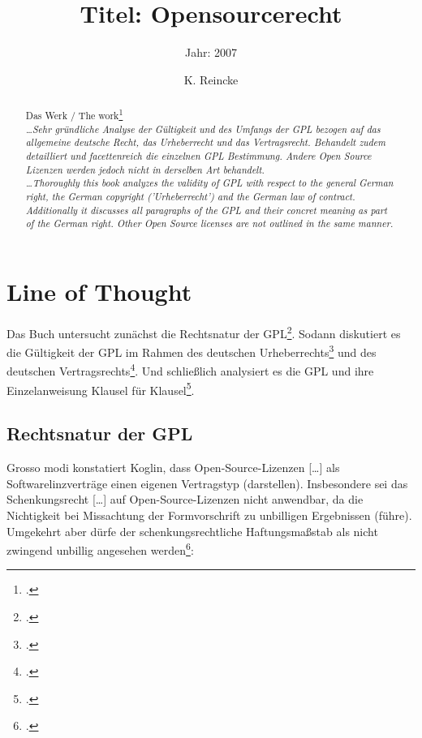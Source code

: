 \documentclass[DIV=calc,BCOR=5mm,11pt,headings=small,oneside,abstract=true, toc=bib]{scrartcl}
\begin{document}

\titlehead{Literaturexzerpt}
\subject{Autor(en): Koglin}
\title{Titel: Opensourcerecht}
\subtitle{Jahr: 2007 }
\author{K. Reincke}

\maketitle

\begin{abstract}
\noindent
Das Werk / The work\footcite[][]{Koglin2007a} \\
\noindent \itshape
\ldots Sehr gründliche Analyse der Gültigkeit und des Umfangs der GPL bezogen
auf das allgemeine deutsche Recht, das Urheberrecht und das Vertragsrecht.
Behandelt zudem detailliert und facettenreich die einzelnen GPL Bestimmung.
Andere Open Source Lizenzen werden jedoch nicht in derselben Art behandelt.\\
\noindent
\ldots Thoroughly this book analyzes the validity of GPL with respect to the
general German right, the German copyright ('Urheberrecht') and the German law
of contract. Additionally it discusses all paragraphs of the GPL and their
concret meaning as part of the German right. Other Open Source licenses are not
outlined in the same manner.
\end{abstract}
\footnotesize
\normalsize

\section{Line of Thought}

Das Buch untersucht zunächst die \glqq{}Rechtsnatur der
GPL\grqq{}\footcite[vgl.][21ff]{Koglin2007a}. Sodann diskutiert es die
Gültigkeit der GPL im Rahmen des deutschen
Urheberrechts\grqq{}\footcite[vgl.][65ff]{Koglin2007a} und des deutschen
Vertragsrechts\grqq{}\footcite[vgl.][135ff]{Koglin2007a}. Und schließlich
analysiert es die GPL und ihre Einzelanweisung Klausel für
Klausel\grqq{}\footcite[vgl.][185ff]{Koglin2007a}.

\subsection{Rechtsnatur der GPL}

Grosso modi konstatiert Koglin, dass \glqq{}Open-Source-Lizenzen [\ldots] als
Softwarelinzverträge einen eigenen Vertragstyp (darstellen)\grqq{}.
Insbesondere sei \glqq{}das Schenkungsrecht [\ldots] auf Open-Source-Lizenzen nicht
anwendbar, da die Nichtigkeit bei Missachtung der Formvorschrift zu
unbilligen Ergebnissen (führe)\grqq{}. Umgekehrt aber dürfe der
\glqq{}schenkungsrechtliche Haftungsmaßstab\grqq{} als \glqq{}nicht zwingend
unbillig\grqq{} angesehen werden\footcite[vgl.][63]{Koglin2007a}:
\end{document}
